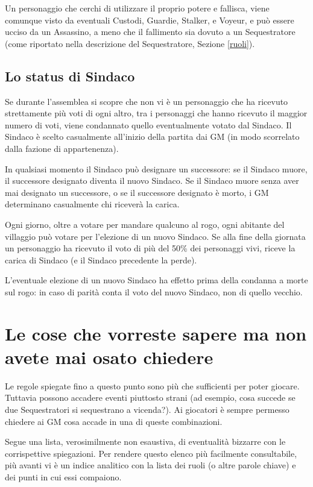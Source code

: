 \documentclass[a4paper,10pt]{article}
\begin{document}
Un personaggio che cerchi di utilizzare il proprio potere e fallisca, viene comunque visto da eventuali Custodi, Guardie, Stalker, e Voyeur, e può essere ucciso da un Assassino, a meno che il fallimento sia dovuto a un Sequestratore (come riportato nella descrizione del Sequestratore, Sezione \ref{ruoli}).

\subsection{Lo status di Sindaco}
\label{sindaco}

Se durante l'assemblea si scopre che non vi è un personaggio che ha ricevuto strettamente più voti di ogni altro, tra i personaggi che hanno ricevuto il maggior numero di voti, viene condannato quello eventualmente votato dal
Sindaco.
Il Sindaco è scelto casualmente all'inizio della partita dai GM (in modo scorrelato dalla fazione di appartenenza).

In qualsiasi momento il Sindaco può designare un successore: se il Sindaco muore, il successore designato diventa il nuovo Sindaco. Se il Sindaco muore senza aver mai designato un successore, o se il successore designato è morto, i GM determinano casualmente chi riceverà la carica.

Ogni giorno, oltre a votare per mandare qualcuno al rogo, ogni abitante del villaggio può votare per l'elezione di un nuovo Sindaco. Se alla fine della giornata un personaggio ha ricevuto il voto di più del 50\% dei personaggi vivi, riceve la carica di Sindaco (e il Sindaco precedente la perde).

L'eventuale elezione di un nuovo Sindaco ha effetto prima della condanna a morte sul rogo: in caso di parità conta il voto del nuovo Sindaco, non di quello vecchio.


\pagebreak
\section{Le cose che vorreste sapere ma non avete mai osato chiedere}
\label{faq}

Le regole spiegate fino a questo punto sono più che sufficienti per poter giocare. Tuttavia possono accadere eventi piuttosto strani (ad esempio, cosa succede se due Sequestratori si sequestrano a vicenda?). Ai giocatori è sempre permesso chiedere ai GM cosa accade in una di queste combinazioni.

Segue una lista, verosimilmente non esaustiva, di eventualità bizzarre con le corrispettive spiegazioni.
Per rendere questo elenco più facilmente consultabile, più avanti vi è un indice analitico con la lista dei ruoli (o altre parole chiave) e dei punti in cui essi compaiono.
\end{document}
